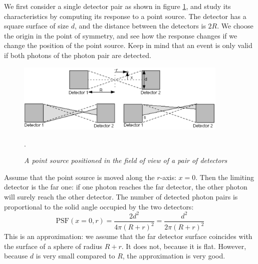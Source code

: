 We first consider a single detector pair as shown in figure
\ref{fig:petdetectorpair}, and study its characteristics by computing its
response to a point source. The detector has a square surface of size $d$, and
the distance between the detectors is $2R$. We choose the origin in the point of
symmetry, and see how the response changes if we change the position of the
point source. Keep in mind that an event is only valid if both photons of the
photon pair are detected.
%
\begin{figure}[tb]
\centering
\includegraphics[width=0.9\textwidth]{figs/fig_petdetectorpair.pdf}
\caption{\label{fig:petdetectorpair} \emph{A point source positioned in the
field of view of a pair of detectors}}.
\end{figure}

Assume that the point source is moved along the $r$-axis: $x = 0$. Then the
limiting detector is the far one: if one photon reaches the far detector, the
other photon will surely reach the other detector. The number of detected
photon pairs is proportional to the solid angle occupied by the two detectors:
\begin{equation}
  \mbox{PSF}(x=0, r) = \frac{2 d^2}{4 \pi (R+r)^2} = \frac{d^2}{2 \pi (R+r)^2}
\end{equation}
This is an approximation: we assume that the far detector surface coincides
with the surface of a sphere of radius $R+r$. It does not, because it is flat.
However, because $d$ is very small compared to $R$, the approximation is very
good.

